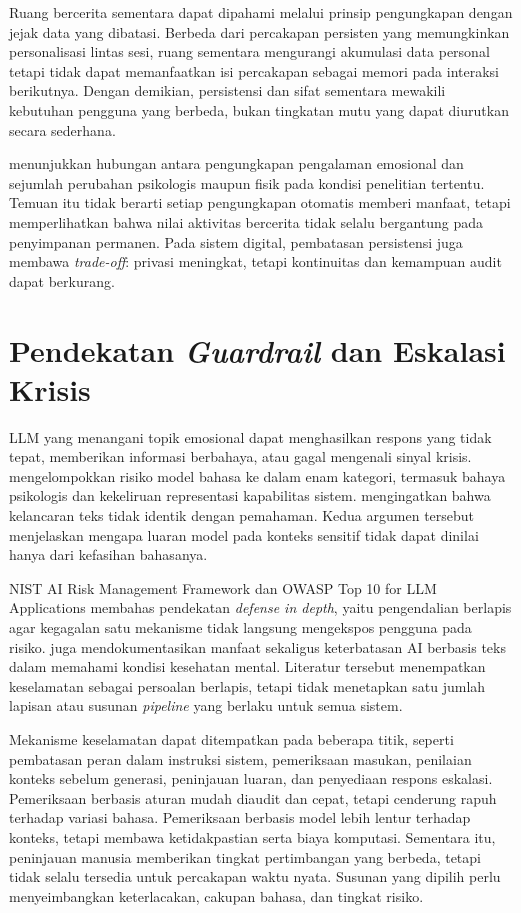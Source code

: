 Ruang bercerita sementara dapat dipahami melalui prinsip pengungkapan dengan jejak data yang dibatasi. Berbeda dari percakapan persisten yang memungkinkan personalisasi lintas sesi, ruang sementara mengurangi akumulasi data personal tetapi tidak dapat memanfaatkan isi percakapan sebagai memori pada interaksi berikutnya. Dengan demikian, persistensi dan sifat sementara mewakili kebutuhan pengguna yang berbeda, bukan tingkatan mutu yang dapat diurutkan secara sederhana.

\textcite{pennebaker1997} menunjukkan hubungan antara pengungkapan pengalaman emosional dan sejumlah perubahan psikologis maupun fisik pada kondisi penelitian tertentu. Temuan itu tidak berarti setiap pengungkapan otomatis memberi manfaat, tetapi memperlihatkan bahwa nilai aktivitas bercerita tidak selalu bergantung pada penyimpanan permanen. Pada sistem digital, pembatasan persistensi juga membawa \textit{trade-off}: privasi meningkat, tetapi kontinuitas dan kemampuan audit dapat berkurang.

\section{Pendekatan \textit{Guardrail} dan Eskalasi Krisis}
\label{sec:guardrail}

LLM yang menangani topik emosional dapat menghasilkan respons yang tidak tepat, memberikan informasi berbahaya, atau gagal mengenali sinyal krisis. \textcite{weidinger2022} mengelompokkan risiko model bahasa ke dalam enam kategori, termasuk bahaya psikologis dan kekeliruan representasi kapabilitas sistem. \textcite{bender2021stochastic} mengingatkan bahwa kelancaran teks tidak identik dengan pemahaman. Kedua argumen tersebut menjelaskan mengapa luaran model pada konteks sensitif tidak dapat dinilai hanya dari kefasihan bahasanya.

NIST AI Risk Management Framework \parencite{nistAirmf2023} dan OWASP Top 10 for LLM Applications \parencite{owaspLlmTop10_2025} membahas pendekatan \textit{defense in depth}, yaitu pengendalian berlapis agar kegagalan satu mekanisme tidak langsung mengekspos pengguna pada risiko. \textcite{deChoudhury2023} juga mendokumentasikan manfaat sekaligus keterbatasan AI berbasis teks dalam memahami kondisi kesehatan mental. Literatur tersebut menempatkan keselamatan sebagai persoalan berlapis, tetapi tidak menetapkan satu jumlah lapisan atau susunan \textit{pipeline} yang berlaku untuk semua sistem.

Mekanisme keselamatan dapat ditempatkan pada beberapa titik, seperti pembatasan peran dalam instruksi sistem, pemeriksaan masukan, penilaian konteks sebelum generasi, peninjauan luaran, dan penyediaan respons eskalasi. Pemeriksaan berbasis aturan mudah diaudit dan cepat, tetapi cenderung rapuh terhadap variasi bahasa. Pemeriksaan berbasis model lebih lentur terhadap konteks, tetapi membawa ketidakpastian serta biaya komputasi. Sementara itu, peninjauan manusia memberikan tingkat pertimbangan yang berbeda, tetapi tidak selalu tersedia untuk percakapan waktu nyata. Susunan yang dipilih perlu menyeimbangkan keterlacakan, cakupan bahasa, dan tingkat risiko.

